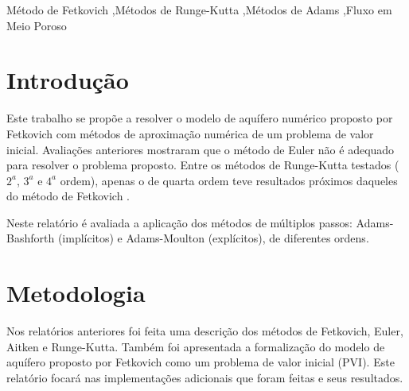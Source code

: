 \documentclass[final,5p]{elsarticle}
\numberwithin{equation}{section}
\begin{document}
\begin{frontmatter}
\begin{abstract}
\end{abstract}




\begin{keyword}
    Método de Fetkovich \sep Métodos de Runge-Kutta \sep Métodos de Adams \sep Fluxo em Meio Poroso



\end{keyword}

\end{frontmatter}


\section{Introdução}

    Este trabalho se propõe a resolver o modelo de aquífero numérico proposto por Fetkovich com métodos de aproximação numérica de um problema de valor inicial. Avaliações anteriores mostraram que o método de Euler não é adequado para resolver o problema proposto. Entre os métodos de Runge-Kutta testados ($2^a$, $3^a$ e $4^a$ ordem), apenas o de quarta ordem teve resultados próximos daqueles do método de Fetkovich \cite{relatoriorungekutta}.

    Neste relatório é avaliada a aplicação dos métodos de múltiplos passos: Adams-Bashforth (implícitos) e Adams-Moulton (explícitos), de diferentes ordens.

\section{Metodologia}

        Nos relatórios anteriores \cite{relatorioeuler}\cite{relatoriorungekutta} foi feita uma descrição dos métodos de Fetkovich, Euler, Aitken e Runge-Kutta. Também foi apresentada a formalização do modelo de aquífero proposto por Fetkovich como um problema de valor inicial (PVI). Este relatório focará nas implementações adicionais que foram feitas e seus resultados.
\end{document}
